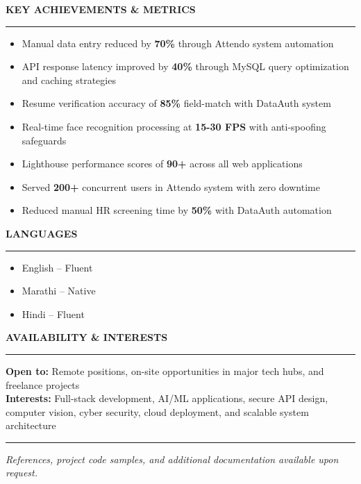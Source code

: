 \documentclass[10pt,letterpaper]{article}
\newcommand{\resheading}[1]{
    {\large \textbf{#1}}
    \vspace{0.3em}
    \hrule
    \vspace{0.1em}
}
\newcommand{\resitem}[1]{
    \item #1 \vspace{-0.2em}
}
\begin{document}
\vspace{0.4em}

\resheading{KEY ACHIEVEMENTS \& METRICS}

\begin{itemize}[itemsep=0.2em]
    \resitem{Manual data entry reduced by \textbf{70\%} through Attendo system automation}
    \resitem{API response latency improved by \textbf{40\%} through MySQL query optimization and caching strategies}
    \resitem{Resume verification accuracy of \textbf{85\%} field-match with DataAuth system}
    \resitem{Real-time face recognition processing at \textbf{15-30 FPS} with anti-spoofing safeguards}
    \resitem{Lighthouse performance scores of \textbf{90+} across all web applications}
    \resitem{Served \textbf{200+} concurrent users in Attendo system with zero downtime}
    \resitem{Reduced manual HR screening time by \textbf{50\%} with DataAuth automation}
\end{itemize}

\vspace{0.4em}

\resheading{LANGUAGES}

\begin{itemize}[itemsep=0.2em]
    \resitem{English -- Fluent}
    \resitem{Marathi -- Native}
    \resitem{Hindi -- Fluent}
\end{itemize}

\vspace{0.4em}

\resheading{AVAILABILITY \& INTERESTS}

\small
\textbf{Open to:} Remote positions, on-site opportunities in major tech hubs, and freelance projects \\
\textbf{Interests:} Full-stack development, AI/ML applications, secure API design, computer vision, cyber security, cloud deployment, and scalable system architecture \\

\vspace{0.3em}

\small
\hrule
\vspace{0.2em}
\centering
\textit{References, project code samples, and additional documentation available upon request.} \\
\end{document}
